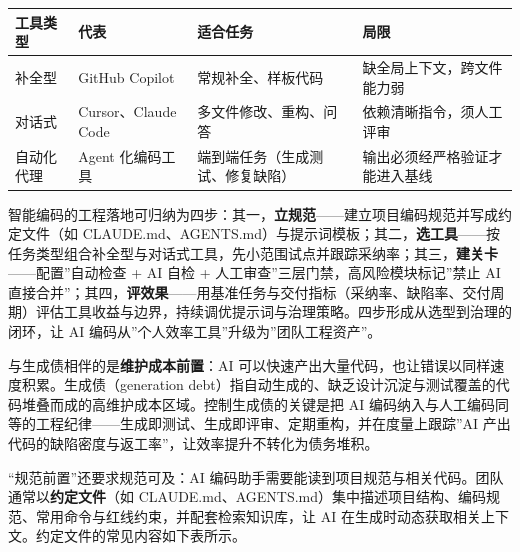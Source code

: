 \documentclass[
]{ctexbook}
\newcounter{none}
\begin{document}
{\def\LTcaptype{none} %
\begin{longtable}[]{@{}
  >{\raggedright\arraybackslash}p{}
  >{\raggedright\arraybackslash}p{}
  >{\raggedright\arraybackslash}p{}
  >{\raggedright\arraybackslash}p{}@{}}
\toprule\noalign{}
\begin{minipage}[b]{\linewidth}\raggedright
工具类型
\end{minipage} & \begin{minipage}[b]{\linewidth}\raggedright
代表
\end{minipage} & \begin{minipage}[b]{\linewidth}\raggedright
适合任务
\end{minipage} & \begin{minipage}[b]{\linewidth}\raggedright
局限
\end{minipage} \\
\midrule\noalign{}
\endhead
\bottomrule\noalign{}
\endlastfoot
补全型 & GitHub Copilot & 常规补全、样板代码 &
缺全局上下文，跨文件能力弱 \\
对话式 & Cursor、Claude Code & 多文件修改、重构、问答 &
依赖清晰指令，须人工评审 \\
自动化代理 & Agent 化编码工具 & 端到端任务（生成测试、修复缺陷） &
输出必须经严格验证才能进入基线 \\
\end{longtable}
}

智能编码的工程落地可归纳为四步：其一，\textbf{立规范}------建立项目编码规范并写成约定文件（如
CLAUDE.md、AGENTS.md）与提示词模板；其二，\textbf{选工具}------按任务类型组合补全型与对话式工具，先小范围试点并跟踪采纳率；其三，\textbf{建关卡}------配置''自动检查
+ AI 自检 + 人工审查''三层门禁，高风险模块标记''禁止 AI
直接合并''；其四，\textbf{评效果}------用基准任务与交付指标（采纳率、缺陷率、交付周期）评估工具收益与边界，持续调优提示词与治理策略。四步形成从选型到治理的闭环，让
AI 编码从''个人效率工具''升级为''团队工程资产''。

与生成债相伴的是\textbf{维护成本前置}：AI
可以快速产出大量代码，也让错误以同样速度积累。生成债（generation
debt）指自动生成的、缺乏设计沉淀与测试覆盖的代码堆叠而成的高维护成本区域。控制生成债的关键是把
AI
编码纳入与人工编码同等的工程纪律------生成即测试、生成即评审、定期重构，并在度量上跟踪''AI
产出代码的缺陷密度与返工率''，让效率提升不转化为债务堆积。

``规范前置''还要求规范可及：AI
编码助手需要能读到项目规范与相关代码。团队通常以\textbf{约定文件}（如
CLAUDE.md、AGENTS.md）集中描述项目结构、编码规范、常用命令与红线约束，并配套检索知识库，让
AI 在生成时动态获取相关上下文。约定文件的常见内容如下表所示。
\end{document}
